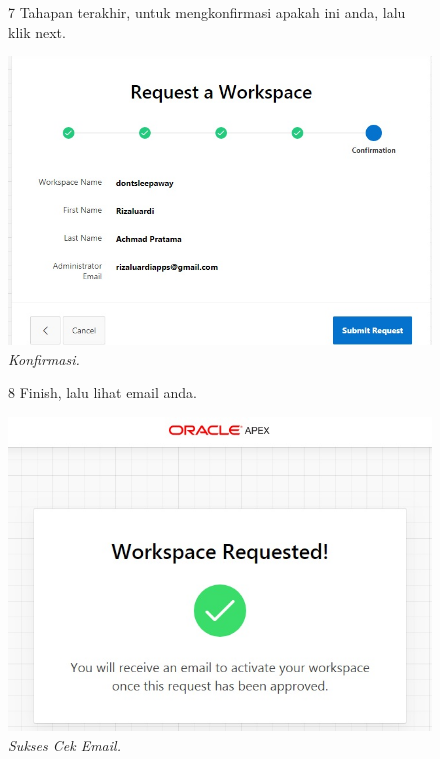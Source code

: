 \begin{enumerate}
\begin{figure}
\label{gambar}
\end{figure}

\begin{figure}
\item[7] Tahapan terakhir, untuk mengkonfirmasi apakah ini anda, lalu klik next.

    \begin{center}
\includegraphics[scale=0.5]{figures/req5.jpg}
    \caption{\textit{Konfirmasi.}}
        \end{center}
\label{gambar}
\end{figure}

\begin{figure}
\item[8] Finish, lalu lihat email anda.

    \begin{center}
\includegraphics[scale=0.5]{figures/req6.jpg}
    \caption{\textit{Sukses Cek Email.}}
        \end{center}
\label{gambar}
\end{figure}


\end{enumerate}
